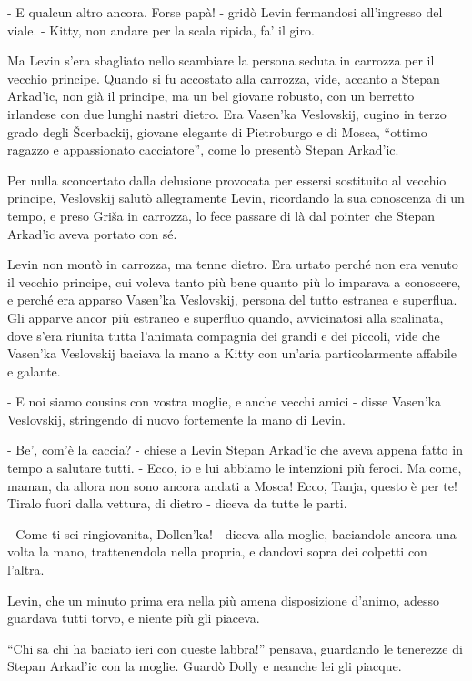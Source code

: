 - E qualcun altro ancora. Forse papà! - gridò Levin fermandosi all'ingresso del viale. - Kitty, non andare per la scala ripida, fa' il giro. 

Ma Levin s'era sbagliato nello scambiare la persona seduta in carrozza per il vecchio principe. Quando si fu accostato alla carrozza, vide, accanto a Stepan Arkad'ic, non già il principe, ma un bel giovane robusto, con un berretto irlandese con due lunghi nastri dietro. Era Vasen'ka Veslovskij, cugino in terzo grado degli Šcerbackij, giovane elegante di Pietroburgo e di Mosca, ``ottimo ragazzo e appassionato cacciatore'', come lo presentò Stepan Arkad'ic. 

Per nulla sconcertato dalla delusione provocata per essersi sostituito al vecchio principe, Veslovskij salutò allegramente Levin, ricordando la sua conoscenza di un tempo, e preso Griša in carrozza, lo fece passare di là dal pointer che Stepan Arkad'ic aveva portato con sé. 

Levin non montò in carrozza, ma tenne dietro. Era urtato perché non era venuto il vecchio principe, cui voleva tanto più bene quanto più lo imparava a conoscere, e perché era apparso Vasen'ka Veslovskij, persona del tutto estranea e superflua. Gli apparve ancor più estraneo e superfluo quando, avvicinatosi alla scalinata, dove s'era riunita tutta l'animata compagnia dei grandi e dei piccoli, vide che Vasen'ka Veslovskij baciava la mano a Kitty con un'aria particolarmente affabile e galante. 

- E noi siamo cousins con vostra moglie, e anche vecchi amici - disse Vasen'ka Veslovskij, stringendo di nuovo fortemente la mano di Levin. 

- Be', com'è la caccia? - chiese a Levin Stepan Arkad'ic che aveva appena fatto in tempo a salutare tutti. - Ecco, io e lui abbiamo le intenzioni più feroci. Ma come, maman, da allora non sono ancora andati a Mosca! Ecco, Tanja, questo è per te! Tiralo fuori dalla vettura, di dietro - diceva da tutte le parti. 

- Come ti sei ringiovanita, Dollen'ka! - diceva alla moglie, baciandole ancora una volta la mano, trattenendola nella propria, e dandovi sopra dei colpetti con l'altra. 

Levin, che un minuto prima era nella più amena disposizione d'animo, adesso guardava tutti torvo, e niente più gli piaceva. 

``Chi sa chi ha baciato ieri con queste labbra!'' pensava, guardando le tenerezze di Stepan Arkad'ic con la moglie. Guardò Dolly e neanche lei gli piacque. 

